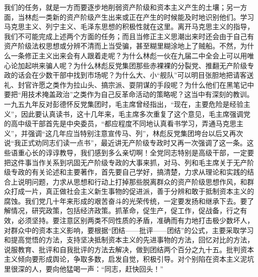 \begin{maonote}
我们的任务，就是一方而要逐步地削弱资产阶级和资本主义产生的土壤；另一方面，当林彪一类新的资产阶级产生出来或正在产生的时候能及时地识别他们。学习马克思主义、列宁主义、毛泽东思想的积极性就在这里。离开马克思主义的指导，我们不可能完成上述两个方面的任务；而且当修正主义思潮出来时还会由于自己有资产阶级法权思想或分辨不清而上当受骗，甚至糊里糊涂地上了贼船。不然，为什么一条修正主义出来会有人跟着走呢？为什么林彪一伙在九届二中全会上可以用唯心论加起哄来骗人呢？为什么林彪反党集团那些赤裸裸的分裂党、推翻无产阶级专政的话会在少数干部中找到市场呢？为什么大、小“舰队”可以明目张胆地把请客送礼、封官许愿之类作为拉山头、搞宗派、耍阴谋的手段呢？为什么他们在黑笔记中要把“用技术掩盖政治”之类作为自己反革命活动的策略呢？这当中有深刻的教训。一九五九年反对彭德怀反党集团时，毛主席曾经指出，“现在，主要危险是经验主义”，因此要认真读书，这十几年来，毛主席多次重复了这个意见，毛主席强调党的高中级干部首先是中央委员，“都应程度不同地认真看书学习，弄通马克思主义”，并强调“这几年应当特别注意宣传马、列”，林彪反党集团垮台以后又再次说“我正式劝同志们读一点书”，最近讲无产阶级专政时又再一次强调了这一条。这些语重心长的谆谆教导，我们感到多么亲切啊！全党同志特别是高级干部，一定要把这件事当作关系到巩固无产阶级专政的大事来抓，对马、列和毛主席关于无产阶级专政的有关论述和主要著作，首先要自己学好，搞清楚，力求从理论和实践的结合上说明问题，力求从思想和行动上打掉那些脱离群众的资产阶级思想作风，和群众打成一片，真正做社会主义新生事物的促进派，善于分辨和敢于抵制资本主义的腐蚀。我们党几十年来形成的艰苦奋斗的光荣传统，一定要发扬和继承下去。要了解情况，研究政策，包括经济政策。抓革命，促生产，促工作，促战备，行之有效，必须坚持。要注意区别两类不同性质的矛盾，准确而有力地打击极少数坏人，对群众中的资本主义影响，要根据“团结——批评——团结”的公式，主要采取学习和提高觉悟的方法，支持坚决抵制资本主义的先进事物的方法，回忆对比的方法，说服教育、批评和自我批评的方法去解决，做到团结两个百分之九十五。批判资本主义倾向要形成舆论，争取多数，启发自觉，积极引导。对个别陷在资本主义泥坑里很深的人，要向他猛喝一声：“同志，赶快回头！”


\end{maonote}
